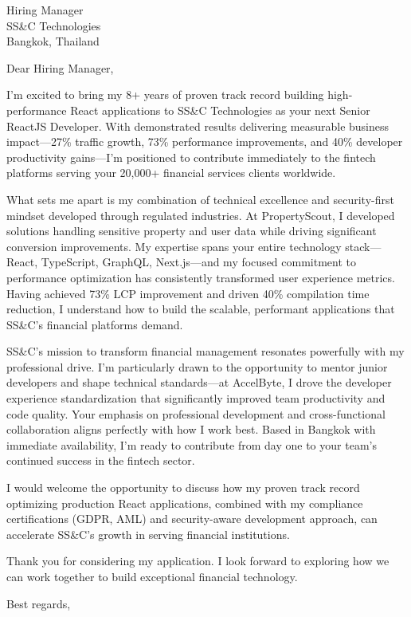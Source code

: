 \documentclass[11pt,a4paper]{letter}
\begin{document}
\begin{letter}{Hiring Manager\\SS\&C Technologies\\Bangkok, Thailand}

\opening{Dear Hiring Manager,}

I'm excited to bring my 8+ years of proven track record building high-performance React applications to SS\&C Technologies as your next Senior ReactJS Developer. With demonstrated results delivering measurable business impact---27\% traffic growth, 73\% performance improvements, and 40\% developer productivity gains---I'm positioned to contribute immediately to the fintech platforms serving your 20,000+ financial services clients worldwide.

What sets me apart is my combination of technical excellence and security-first mindset developed through regulated industries. At PropertyScout, I developed solutions handling sensitive property and user data while driving significant conversion improvements. My expertise spans your entire technology stack---React, TypeScript, GraphQL, Next.js---and my focused commitment to performance optimization has consistently transformed user experience metrics. Having achieved 73\% LCP improvement and driven 40\% compilation time reduction, I understand how to build the scalable, performant applications that SS\&C's financial platforms demand.

SS\&C's mission to transform financial management resonates powerfully with my professional drive. I'm particularly drawn to the opportunity to mentor junior developers and shape technical standards---at AccelByte, I drove the developer experience standardization that significantly improved team productivity and code quality. Your emphasis on professional development and cross-functional collaboration aligns perfectly with how I work best. Based in Bangkok with immediate availability, I'm ready to contribute from day one to your team's continued success in the fintech sector.

I would welcome the opportunity to discuss how my proven track record optimizing production React applications, combined with my compliance certifications (GDPR, AML) and security-aware development approach, can accelerate SS\&C's growth in serving financial institutions.

Thank you for considering my application. I look forward to exploring how we can work together to build exceptional financial technology.

\closing{Best regards,}

\end{letter}
\end{document}
